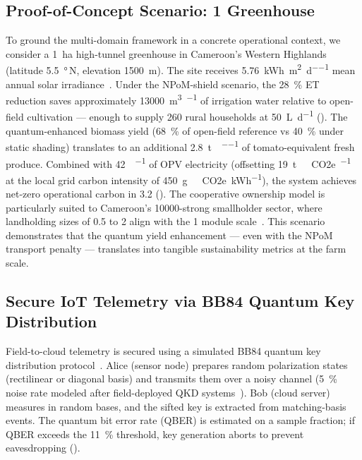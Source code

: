 \documentclass[12pt]{article}
\begin{document}
\subsection*{Proof-of-Concept Scenario: \SI{1}{\ha} Greenhouse}

To ground the multi-domain framework in a concrete operational context, we consider a \SI{1}{\hectare} high-tunnel greenhouse in Cameroon's Western Highlands (latitude \SI{5.5}{\degree}\,N, elevation \SI{1500}{\m}). The site receives \SI{5.76}{\kWh\per\m\squared\per\day} mean annual solar irradiance~\cite{FAO2022}. Under the NPoM-shield scenario, the \SI{28}{\percent} ET reduction saves approximately \SI{13000}{\m\cubed\per\yr} of irrigation water relative to open-field cultivation --- enough to supply \num{260} rural households at \SI{50}{\L\per\day} (). The quantum-enhanced biomass yield (\SI{68}{\percent} of open-field reference vs \SI{40}{\percent} under static shading) translates to an additional \SI{2.8}{\tonne\per\ha\per\yr} of tomato-equivalent fresh produce. Combined with \SI{42}{\MWh\per\yr} of OPV electricity (offsetting \SI{19}{\tonne\ CO2e\per\yr} at the local grid carbon intensity of \SI{450}{\g\ CO2e\per\kWh}), the system achieves net-zero operational carbon in \SI{3.2}{\yr} (). The cooperative ownership model is particularly suited to Cameroon's \num{10000}-strong smallholder sector, where landholding sizes of \SI{0.5}{\ha} to \SI{2}{\ha} align with the \SI{1}{\ha} module scale~\cite{Mohammed2023}. This scenario demonstrates that the quantum yield enhancement --- even with the NPoM transport penalty --- translates into tangible sustainability metrics at the farm scale.

\subsection*{Secure IoT Telemetry via BB84 Quantum Key Distribution}

Field-to-cloud telemetry is secured using a simulated BB84 quantum key distribution protocol~\cite{Bennett1984}.
Alice (sensor node) prepares random polarization states (rectilinear or diagonal basis) and transmits them over a noisy channel (\SI{5}{\percent} noise rate modeled after field-deployed QKD systems~\cite{Zahidy2024}).
Bob (cloud server) measures in random bases, and the sifted key is extracted from matching-basis events.
The quantum bit error rate (QBER) is estimated on a sample fraction; if QBER exceeds the \SI{11}{\percent} threshold, key generation aborts to prevent eavesdropping ().
\end{document}

